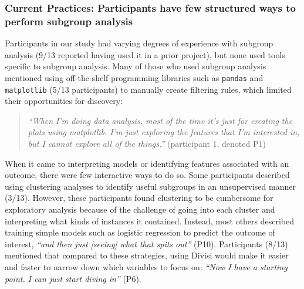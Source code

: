 \subsubsection{Current Practices: Participants have few structured ways to perform subgroup analysis}
\label{sec:results-current-practices}
Participants in our study had varying degrees of experience with subgroup analysis (9/13 reported having used it in a prior project), but none used tools specific to subgroup analysis.
Many of those who used subgroup analysis mentioned using off-the-shelf programming libraries such as \texttt{pandas} and \texttt{matplotlib} (5/13 participants) to manually create filtering rules, which limited their opportunities for discovery: 
\begin{quote}
\textit{``When I'm doing data analysis, most of the time it's just for creating the plots using matplotlib. I'm just exploring the features that I'm interested in, but I cannot explore all of the things.''} (participant 1, denoted P1)
\end{quote}
When it came to interpreting models or identifying features associated with an outcome, there were few interactive ways to do so. 
Some participants described using clustering analyses to identify useful subgroups in an unsupervised manner (3/13).
However, these participants found clustering to be cumbersome for exploratory analysis because of the challenge of going into each cluster and interpreting what kinds of instances it contained.
Instead, most others described training simple models such as logistic regression to predict the outcome of interest, \textit{``and then just [seeing] what that spits out''} (P10).
Participants (8/13) mentioned that compared to these strategies, using Divisi would make it easier and faster to narrow down which variables to focus on:
\textit{``Now I have a starting point. I can just start diving in''} (P6).

